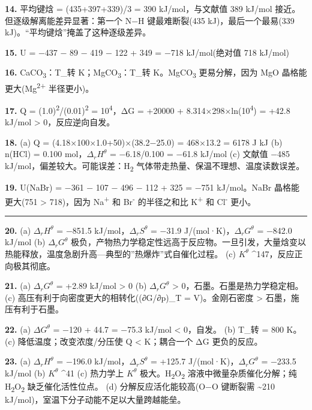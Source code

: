 \textbf{14.} 平均键焓 = (435+397+339)/3 = 390 kJ/mol，与文献值 389 kJ/mol 接近。但逐级解离能差异显著：第一个 N−H 键最难断裂(435 kJ)，最后一个最易(339 kJ)。``平均键焓''掩盖了这种逐级差异。

\textbf{15.} U = −437 − 89 − 419 − 122 + 349 = −718 kJ/mol(绝对值 718 kJ/mol)

\textbf{16.} CaCO\textsubscript{3}：T\_转  K；MgCO\textsubscript{3}：T\_转  K。MgCO\textsubscript{3} 更易分解，因为 MgO 晶格能更大(Mg\textsuperscript{2+} 半径更小)。

\textbf{17.} Q = (1.0)\textsuperscript{2}/(0.01)\textsuperscript{2} = 10\textsuperscript{4}，ΔG = +20000 + 8.314×298×ln(10\textsuperscript{4}) = +42.8 kJ/mol \textgreater{} 0，反应逆向自发。

\textbf{18.}
(a) Q = (4.18×100×1.0+50)×(38.2−25.0) = 468×13.2 = 6178 J  kJ
(b) n(HCl) = 0.100 mol，\(\Delta_r H^\theta\) = −6.18/0.100 = −61.8 kJ/mol
(c) 文献值 −485 kJ/mol，偏差较大。可能误差：H\textsubscript{2} 气体带走热量、保温不理想、温度读数误差。

\textbf{19.} U(NaBr) = −361 − 107 − 496 − 112 + 325 = −751 kJ/mol。NaBr 晶格能更大(751 \textgreater{} 718)，因为 Na\textsuperscript{+} 和 Br\textsuperscript{-} 的半径之和比 K\textsuperscript{+} 和 Cl\textsuperscript{-} 更小。

\begin{center}\rule{0.5\linewidth}{0.5pt}\end{center}

\textbf{20.}
(a) \(\Delta_r H^\theta\) = −851.5 kJ/mol，\(\Delta_r S^\theta\) = −31.9 J/(mol·K)，\(\Delta_r G^\theta\) = −842.0 kJ/mol
(b) \(\Delta_r G^\theta\) 极负，产物热力学稳定性远高于反应物。一旦引发，大量焓变以热能释放，温度急剧升高---典型的''热爆炸''式自催化过程。
(c) \(K^\theta\) \^{}147，反应正向极其彻底。

\textbf{21.}
(a) \(\Delta_r G^\theta\) = +2.89 kJ/mol \textgreater{} 0
(b) \(\Delta_r G^\theta\) \textgreater{} 0，石墨。石墨是热力学稳定相。
(c) 高压有利于向密度更大的相转化((∂G/∂p)\_T = V)。金刚石密度 \textgreater{} 石墨，施压有利于石墨。

\textbf{22.}
(a) \(\Delta G^\theta\) = −120 + 44.7 = −75.3 kJ/mol \textless{} 0，自发。
(b) T\_转 = 800 K。
(c) 降低温度；改变浓度/分压使 Q \textless{} K；耦合一个 ΔG 更负的反应。

\textbf{23.}
(a) \(\Delta_r H^\theta\) = −196.0 kJ/mol，\(\Delta_r S^\theta\) = +125.7 J/(mol·K)，\(\Delta_r G^\theta\) = −233.5 kJ/mol
(b) \(K^\theta\) \^{}41
(c) 热力学上 \(K^\theta\) 极大。H\textsubscript{2}O\textsubscript{2} 溶液中微量杂质催化分解；纯 H\textsubscript{2}O\textsubscript{2} 缺乏催化活性位点。
(d) 分解反应活化能较高(O−O 键断裂需 \textasciitilde210 kJ/mol)，室温下分子动能不足以大量跨越能垒。

